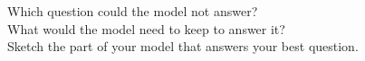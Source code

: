 \vspace{8pt}
Which question could the model not answer? \wline[7cm]\\[10pt]
What would the model need to keep to answer it? \wline[5cm]\\[10pt]
Sketch the part of your model that answers your best question.\par\medskip
{}
\clearpage
